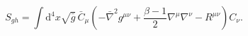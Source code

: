 \begin{equation}
  \label{eq:gh.action}
  S_{gh}=\int\!\mathrm{d}^4 x \sqrt{\bar{g}}\, \bar{C}_\mu
  \left(-\bar{\nabla}^2 g^{\mu\nu}+\frac{\beta-1}{2} \nabla^\mu\nabla^\nu
    -R^{\mu\nu}\right) C_\nu.
\end{equation}

